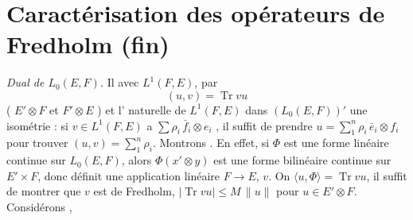 \documentclass[11pt,a4paper]{article}
\begin{document}
\section{Caractérisation des opérateurs de Fredholm (fin)}


\emph{Dual de $L_0(E,F)$.}  Il \ill{}    \ill{}  avec $L^{1}(F,E)$, \struck{\ill{}} par
\[
  (u, v) = \operatorname{Tr} vu
\]
 (\ill{} $E' \otimes F$ et $F' \otimes E$ \ill{} \ill{} \ill{}) et l' naturelle de $L^{1}(F,E)$ dans $(L_0(E,F))'$  une isométrie : si $v \in L^{1}(F,E)$ a \ill{} $\sum \rho_i\, \bar{f}_i \otimes e_i$ , il suffit de prendre $u = \sum_{1}^{n} \rho_i\, \bar{e}_i \otimes f_i$ pour trouver $(u,v) = \sum_{1}^{n} \rho_i$.  Montrons   \ill{}. En effet, si $\Phi$ est une forme linéaire continue sur $L_0(E,F)$, alors $\Phi(x' \otimes y)$ est une forme bilinéaire continue sur $E' \times F$, donc définit une application linéaire $F \to E$,  $v$. On \struck{\ill{}} $\langle u, \Phi\rangle = \operatorname{Tr} vu$, il suffit de montrer que $v$ est de Fredholm,   $|\operatorname{Tr} vu| \leq M\,\|u\|$ pour $u \in E' \otimes F$. Considérons , 

 
\end{document}
